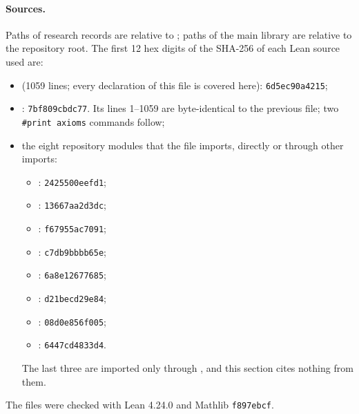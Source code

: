 \paragraph{Sources.}
Paths of research records are relative to ; paths of the main library are relative
to the repository root. The first 12 hex digits of the SHA-256 of each Lean source used are:
\begin{itemize}
\item {} (1059 lines; every declaration of this file is covered here):
  \texttt{6d5ec90a4215};
\item {}: \texttt{7bf809cbdc77}. Its lines 1--1059 are byte-identical to
  the previous file; two \texttt{\#print axioms} commands follow;
\item the eight repository modules that the file imports, directly or through other imports:
  \begin{itemize}
  \item {}: \texttt{2425500eefd1};
  \item {}: \texttt{13667aa2d3dc};
  \item {}: \texttt{f67955ac7091};
  \item {}: \texttt{c7db9bbbb65e};
  \item {}: \texttt{6a8e12677685};
  \item {}: \texttt{d21becd29e84};
  \item {}: \texttt{08d0e856f005};
  \item {}: \texttt{6447cd4833d4}.
  \end{itemize}
  The last three are imported only through , and this section cites
  nothing from them.
\end{itemize}
The files were checked with Lean 4.24.0 and Mathlib \texttt{f897ebcf}.


